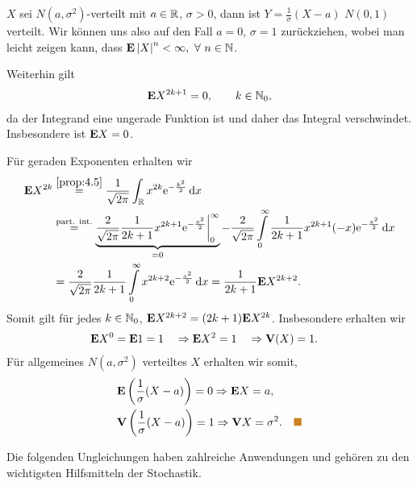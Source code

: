 \begin{bsp}
$X$ sei $N(a,\sigma^ {2})$-verteilt mit $a \in \mathbb{R}$, $\sigma >
0$, dann ist $Y=\frac{1}{\sigma}(X-a)$ $N(0,1)$ verteilt.
Wir können uns also auf den Fall $a=0$, $\sigma=1$ zurückziehen, wobei
man leicht zeigen kann, dass $\E\abs{X}^n < \infty, \forall n\in\N$.

Weiterhin gilt
\begin{align*}
\textbf{E} X^{2k+1} = 0,\qquad k\in\mathbb{N}_0,
\end{align*}
da der Integrand eine ungerade Funktion ist und daher das Integral
verschwindet. Insbesondere ist $\textbf{E} X =0$.

Für geraden Exponenten erhalten wir
\begin{align*}
\textbf{E} X^{2k} &\overset{\ref{prop:4.5}}{=}
\frac{1}{\sqrt{2\pi}}
\int_{\mathbb{R}} x^{2k} \mathrm{e}^{-\frac{k^2}{2}}\,\mathrm{d} x\\
&\overset{\text{part. int.}}{=}
\underbrace{\frac{2}{\sqrt{2\pi}} \frac{1}{2k+1}
x^{2k+1}\mathrm{e}^{-\frac{x^2}{2}}\bigg|_0^\infty}_{=0} - \frac{2}{\sqrt{2\pi}}
\int\limits_0^\infty \frac{1}{2k+1} x^{2k+1}(-x)\mathrm{e}^{-\frac{x^2}{2}}\,\mathrm{d} x\\
&=
\frac{2}{\sqrt{2\pi}}\frac{1}{2k+1}
\int\limits_0^\infty  x^{2k+2}\mathrm{e}^{-\frac{x^2}{2}}\,\mathrm{d} x
= \frac{1}{2k+1}\textbf{E} X^{2k+2}.
\end{align*}
Somit gilt für jedes $k\in\mathbb{N}_0$, $\textbf{E} X^{2k+2} = (2k+1)\textbf{E} X^{2k}$. Insbesondere
erhalten wir
\begin{align*}
&\textbf{E} X^0 = \textbf{E} 1 = 1\quad \Rightarrow \textbf{E} X^2 = 1
\quad  \Rightarrow \textbf{V}(X) = 1.
\end{align*}
Für allgemeines $N(a,\sigma^2)$ verteiltes $X$ erhalten wir somit,
\begin{align*}
&\E \left(\frac{1}{\sigma}(X-a)\right) = 0\Rightarrow \E X = a,\\
&\V \left(\frac{1}{\sigma}(X-a)\right) = 1\Rightarrow \V X =
\sigma^2.\bsphere
\end{align*}
\end{bsp}

Die folgenden Ungleichungen haben zahlreiche Anwendungen und gehören zu den
wichtigsten Hilfsmitteln der Stochastik.


